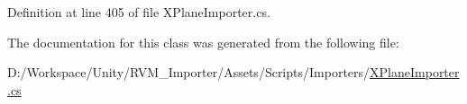 Definition at line 405 of file X\+Plane\+Importer.\+cs.



The documentation for this class was generated from the following file\+:\begin{DoxyCompactItemize}
\item 
D\+:/\+Workspace/\+Unity/\+R\+V\+M\+\_\+\+Importer/\+Assets/\+Scripts/\+Importers/\mbox{\hyperlink{_x_plane_importer_8cs}{X\+Plane\+Importer.\+cs}}\end{DoxyCompactItemize}
